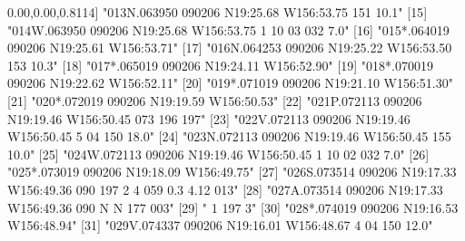 \documentclass[
]{book}
\newenvironment{Shaded}{\begin{snugshade}}{\end{snugshade}}
\newcommand{\DecValTok}[1]{\textcolor[rgb]{0.00,0.00,0.81}{#1}}
\newcommand{\NormalTok}[1]{#1}
\newcommand{\StringTok}[1]{\textcolor[rgb]{0.31,0.60,0.02}{#1}}
\begin{document}
\begin{Shaded}
\begin{Highlighting}[]
\NormalTok{[}\DecValTok{14}\NormalTok{] }\StringTok{"013N.063950 090206 N19:25.68 W156:53.75  151 10.1"}                                     
\NormalTok{[}\DecValTok{15}\NormalTok{] }\StringTok{"014W.063950 090206 N19:25.68 W156:53.75    1   10   03  032  7.0"}                      
\NormalTok{[}\DecValTok{16}\NormalTok{] }\StringTok{"015*.064019 090206 N19:25.61 W156:53.71"}                                               
\NormalTok{[}\DecValTok{17}\NormalTok{] }\StringTok{"016N.064253 090206 N19:25.22 W156:53.50  153 10.3"}                                     
\NormalTok{[}\DecValTok{18}\NormalTok{] }\StringTok{"017*.065019 090206 N19:24.11 W156:52.90"}                                               
\NormalTok{[}\DecValTok{19}\NormalTok{] }\StringTok{"018*.070019 090206 N19:22.62 W156:52.11"}                                               
\NormalTok{[}\DecValTok{20}\NormalTok{] }\StringTok{"019*.071019 090206 N19:21.10 W156:51.30"}                                               
\NormalTok{[}\DecValTok{21}\NormalTok{] }\StringTok{"020*.072019 090206 N19:19.59 W156:50.53"}                                               
\NormalTok{[}\DecValTok{22}\NormalTok{] }\StringTok{"021P.072113 090206 N19:19.46 W156:50.45  073  196  197"}                                
\NormalTok{[}\DecValTok{23}\NormalTok{] }\StringTok{"022V.072113 090206 N19:19.46 W156:50.45    5   04  150      18.0"}                      
\NormalTok{[}\DecValTok{24}\NormalTok{] }\StringTok{"023N.072113 090206 N19:19.46 W156:50.45  155 10.0"}                                     
\NormalTok{[}\DecValTok{25}\NormalTok{] }\StringTok{"024W.072113 090206 N19:19.46 W156:50.45    1   10   02  032  7.0"}                      
\NormalTok{[}\DecValTok{26}\NormalTok{] }\StringTok{"025*.073019 090206 N19:18.09 W156:49.75"}                                               
\NormalTok{[}\DecValTok{27}\NormalTok{] }\StringTok{"026S.073514 090206 N19:17.33 W156:49.36  090  197    2    4  059  0.3 4.12  013"}       
\NormalTok{[}\DecValTok{28}\NormalTok{] }\StringTok{"027A.073514 090206 N19:17.33 W156:49.36  090         N    N  177  003"}                 
\NormalTok{[}\DecValTok{29}\NormalTok{] }\StringTok{"   1                                     197              3"}                           
\NormalTok{[}\DecValTok{30}\NormalTok{] }\StringTok{"028*.074019 090206 N19:16.53 W156:48.94"}                                               
\NormalTok{[}\DecValTok{31}\NormalTok{] }\StringTok{"029V.074337 090206 N19:16.01 W156:48.67    4   04  150      12.0"}                      
\end{Highlighting}
\end{Shaded}
\end{document}
